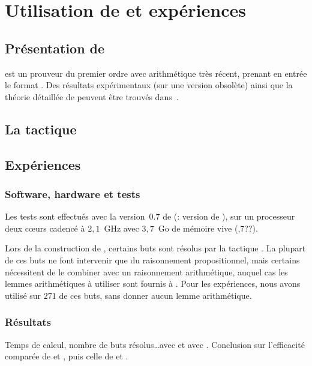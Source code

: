 \section{Utilisation de \beagle et expériences}
\label{sec:experiences}

\subsection{Présentation de \beagle}
\beagle est un prouveur du premier ordre avec arithmétique très récent,
prenant en entrée le format \tff. Des résultats expérimentaux (sur une
version obsolète) ainsi que la théorie détaillée de \beagle peuvent être
trouvés dans~\cite{DBLP:conf/cade/BaumgartnerW13}.


\subsection{La tactique \beagletac}
\label{sec:experiences:beagletac}

\todo


\subsection{Expériences}
\label{sec:experiences:experiences}

\subsubsection{Software, hardware et tests}
Les tests sont effectués avec la version~$0.7$ de \beagle (\todo:
version de \holfour), sur un processeur deux cœurs cadencé à $2,1$~GHz
avec $3,7$~Go de mémoire vive (,7??).

Lors de la construction de \holfour, certains buts sont résolus par la
tactique \metistac. La plupart de ces buts ne font intervenir que du
raisonnement propositionnel, mais certains nécessitent de le combiner
avec un raisonnement arithmétique, auquel cas les lemmes arithmétiques à
utiliser sont fournis à \metistac. Pour les expériences, nous avons
utilisé \beagletac sur $271$ de ces buts, sans donner aucun lemme
arithmétique.


\subsubsection{Résultats}

\todo Temps de calcul, nombre de buts résolus\dots avec \metistac et
avec \beagletac. Conclusion sur l'efficacité comparée de \beagletac et
\metistac, puis celle de \beagle et \metis.

